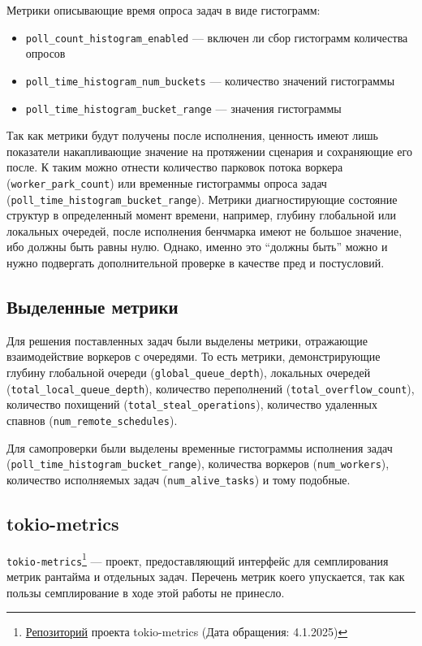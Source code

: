 Метрики описывающие время опроса задач в виде гистограмм:

\begin{itemize}
    \item \verb|poll_count_histogram_enabled| --- включен ли сбор гистограмм количества опросов

    \item \verb|poll_time_histogram_num_buckets| --- количество значений гистограммы

    \item \verb|poll_time_histogram_bucket_range| --- значения гистограммы
\end{itemize}

Так как метрики будут получены после исполнения, ценность имеют лишь показатели накапливающие значение на протяжении сценария и сохраняющие его после. К таким можно отнести количество парковок потока воркера (\verb|worker_park_count|) или временные гистограммы опроса задач (\verb|poll_time_histogram_bucket_range|). Метрики диагностирующие состояние структур в определенный момент времени, например, глубину глобальной или локальных очередей, после исполнения бенчмарка имеют не большое значение, ибо должны быть равны нулю. Однако, именно это ``должны быть'' можно и нужно подвергать дополнительной проверке в качестве пред и постусловий.

\subsection{Выделенные метрики}

Для решения поставленных задач были выделены метрики, отражающие взаимодействие воркеров с очередями. То есть метрики, демонстрирующие глубину глобальной очереди (\verb|global_queue_depth|), локальных очередей (\verb|total_local_queue_depth|), количество переполнений (\verb|total_overflow_count|), количество похищений (\verb|total_steal_operations|), количество удаленных спавнов (\verb|num_remote_schedules|).

Для самопроверки были выделены временные гистограммы исполнения задач (\verb|poll_time_histogram_bucket_range|), количества воркеров (\verb|num_workers|), количество исполняемых задач (\verb|num_alive_tasks|) и тому подобные.

\subsection{tokio-metrics}

\verb|tokio-metrics|\footnote{\href{https://github.com/tokio-rs/tokio-metrics}{Репозиторий} проекта tokio-metrics (Дата обращения: 4.1.2025)} --- проект, предоставляющий интерфейс для семплирования метрик рантайма и отдельных задач. Перечень метрик коего упускается, так как пользы семплирование в ходе этой работы не принесло.
